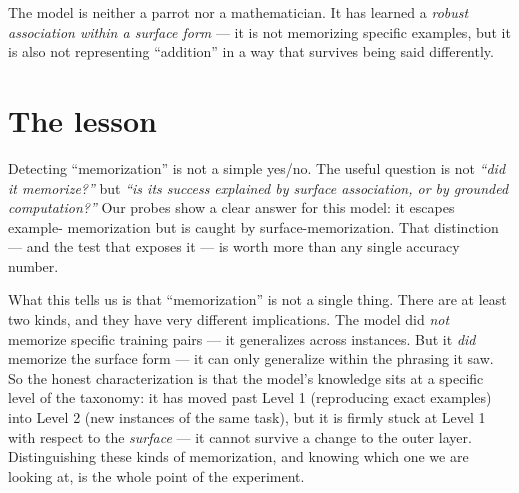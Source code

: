 The model is neither a parrot nor a mathematician. It has learned a
\emph{robust association within a surface form} --- it is not memorizing
specific examples, but it is also not representing ``addition'' in a way
that survives being said differently.

\section{The lesson}\label{the-lesson}

Detecting ``memorization'' is not a simple yes/no. The useful question
is not \emph{``did it memorize?''} but \emph{``is its success explained
by surface association, or by grounded computation?''} Our probes show a
clear answer for this model: it escapes example- memorization but is
caught by surface-memorization. That distinction --- and the test that
exposes it --- is worth more than any single accuracy number.

What this tells us is that ``memorization'' is not a single thing. There
are at least two kinds, and they have very different implications. The
model did \emph{not} memorize specific training pairs --- it generalizes
across instances. But it \emph{did} memorize the surface form --- it can
only generalize within the phrasing it saw. So the honest
characterization is that the model's knowledge sits at a specific level
of the taxonomy: it has moved past Level 1 (reproducing exact examples)
into Level 2 (new instances of the same task), but it is firmly stuck at
Level 1 with respect to the \emph{surface} --- it cannot survive a
change to the outer layer. Distinguishing these kinds of memorization,
and knowing which one we are looking at, is the whole point of the
experiment.

